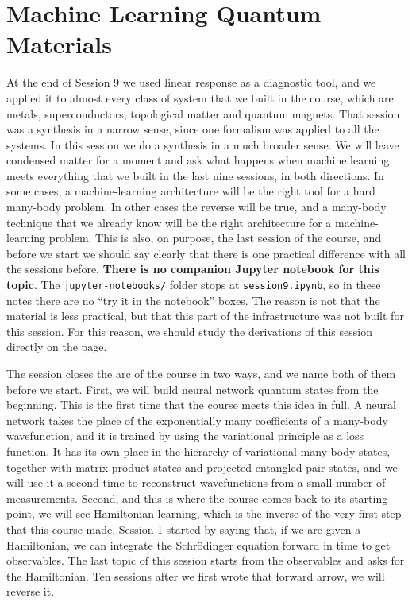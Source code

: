 \chapter{Machine Learning Quantum Materials}

At the end of Session 9 we used linear response as a diagnostic tool, and we applied it to almost
every class of system that we built in the course, which are metals, superconductors, topological
matter and quantum magnets. That session was a synthesis in a narrow sense, since one formalism
was applied to all the systems. In this session we do a synthesis in a much broader sense. We will
leave condensed matter for a moment and ask what happens when machine learning meets everything
that we built in the last nine sessions, in both directions. In some cases, a machine-learning
architecture will be the right tool for a hard many-body problem. In other cases the reverse will
be true, and a many-body technique that we already know will be the right architecture for a
machine-learning problem. This is also, on purpose, the last session of the course, and before we
start we should say clearly that there is one practical difference with all the sessions before.
\textbf{There is no companion Jupyter notebook for this topic}. The \texttt{jupyter-notebooks/}
folder stops at \texttt{session9.ipynb}, so in these notes there are no ``try it in the notebook''
boxes. The reason is not that the material is less practical, but that this part of the
infrastructure was not built for this session. For this reason, we should study the derivations
of this session directly on the page.

The session closes the arc of the course in two ways, and we name both of them before we start.
First, we will build neural network quantum states from the beginning. This is the first time that
the course meets this idea in full. A neural network takes the place of the exponentially many
coefficients of a many-body wavefunction, and it is trained by using the variational principle as
a loss function. It has its own place in the hierarchy of variational many-body states, together
with matrix product states and projected entangled pair states, and we will use it a second time
to reconstruct wavefunctions from a small number of measurements. Second, and this is where the
course comes back to its starting point, we will see Hamiltonian learning, which is the inverse of
the very first step that this course made. Session 1 started by saying that, if we are given a
Hamiltonian, we can integrate the Schr\"odinger equation forward in time to get observables. The
last topic of this session starts from the observables and asks for the Hamiltonian. Ten sessions
after we first wrote that forward arrow, we will reverse it.

